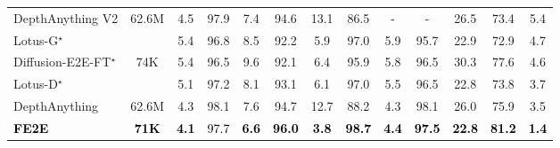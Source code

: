 \documentclass{article} %
\begin{document}
\begin{table}[!ht]
{\begin{tabular}{l|c|cc|cc|cc|cc|cc|c}
DepthAnything V2
& 62.6M & 4.5 & \cellcolor{best2}97.9  & \cellcolor{best2}7.4 & 94.6  & 13.1 & 86.5  & -& -  & 26.5 & 73.4 & 5.4 \\

Lotus-G$^{\star}$ 
& \cellcolor{best}{59K} & 5.4 & 96.8  & 8.5 & 92.2  & \cellcolor{best2}5.9 & \cellcolor{best2}97.0  & 5.9 & 95.7  & \cellcolor{best2}22.9 & 72.9 & 4.7 \\

Diffusion-E2E-FT$^{\star}$ 
& 74K & 5.4 & 96.5  & 9.6 & 92.1  & 6.4 & 95.9  & 5.8 & 96.5  & 30.3 & \cellcolor{best2}77.6 & 4.6 \\

Lotus-D$^{\star}$
& \cellcolor{best}{59K} & 5.1 & 97.2 & 8.1 & 93.1  & 6.1 & \cellcolor{best2}97.0 & 5.5 & 96.5 & \cellcolor{best2}22.8 & 73.8  & \cellcolor{best2}3.7 \\

DepthAnything 
& 62.6M & \cellcolor{best2}4.3 & \cellcolor{best}98.1  & 7.6 & \cellcolor{best2}94.7  & 12.7 & 88.2  & \cellcolor{best}4.3 & \cellcolor{best}98.1 & 26.0 & 75.9 & 3.5\\

\textcolor{black}{\textbf{FE2E}}
& \cellcolor{best2}\textcolor{black}{\textbf{71K}} & \textcolor{black}{\cellcolor{best}\textbf{4.1}} & \textcolor{black}{97.7}  & \textcolor{black}{\cellcolor{best}\textbf{6.6}} & \textcolor{black}{\cellcolor{best}\textbf{96.0}}  & \textcolor{black}{\cellcolor{best}\textbf{3.8}} & \textcolor{black}{\cellcolor{best}\textbf{98.7}}  & \textcolor{black}{\cellcolor{best2}\textbf{4.4}} & \textcolor{black}{\cellcolor{best2}\textbf{97.5}}  & \textcolor{black}{\cellcolor{best}\textbf{22.8}} & \textcolor{black}{\cellcolor{best}\textbf{81.2}}  & \textcolor{black}{\cellcolor{best}\textbf{1.4}} \\
  \bottomrule
  \end{tabular}
  }
  \vspace{-1.5em}
\end{table}
\end{document}
